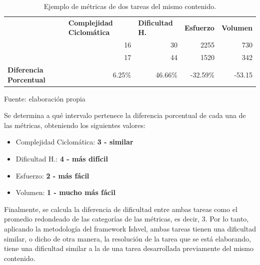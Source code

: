 \documentclass[letterpaper,12pt]{article}
\begin{document}
\begin{table}[H]
  \centering
  \begin{tabular}{l|r|r|r|r|}
    \cline{2-5}
                                                         & \multicolumn{1}{l|}{\textbf{Complejidad Ciclomática}} & \multicolumn{1}{l|}{\textbf{Dificultad H.}} & \multicolumn{1}{l|}{\textbf{Esfuerzo}} & \multicolumn{1}{l|}{\textbf{Volumen}} \\ \cline{2-5}
                                                         & 16                                                    & 30                                          & 2255                                   & 730                                   \\ \cline{2-5}
                                                         & 17                                                    & 44                                          & 1520                                   & 342                                   \\ \hline
    \multicolumn{1}{|l|}{\textbf{Diferencia Porcentual}} & 6.25\%                                                & 46.66\%                                     & -32.59\%                               & -53.15                                \\ \hline
  \end{tabular}
  \caption{Ejemplo de métricas de dos tareas del mismo contenido.} Fuente: elaboración propia
  \label{tab:example-metrics-two-homeworks}
\end{table}

Se determina a qué intervalo pertenece la diferencia porcentual de cada una de las métricas, obteniendo los siguientes valores:

\begin{itemize}
  \item Complejidad Ciclomática: \textbf{3 - similar}
  \item Dificultad H.: \textbf{4 - más difícil}
  \item Esfuerzo: \textbf{2 - más fácil}
  \item Volumen: \textbf{1 - mucho más fácil}
\end{itemize}

Finalmente, se calcula la diferencia de dificultad entre ambas tareas como el promedio redondeado de las categorías de las métricas, es decir, 3. Por lo tanto, aplicando la metodología del framework Ishvel, ambas tareas tienen una dificultad similar, o dicho de otra manera, la resolución de la tarea que se está elaborando, tiene una dificultad similar a la de una tarea desarrollada previamente del mismo contenido.
\end{document}
